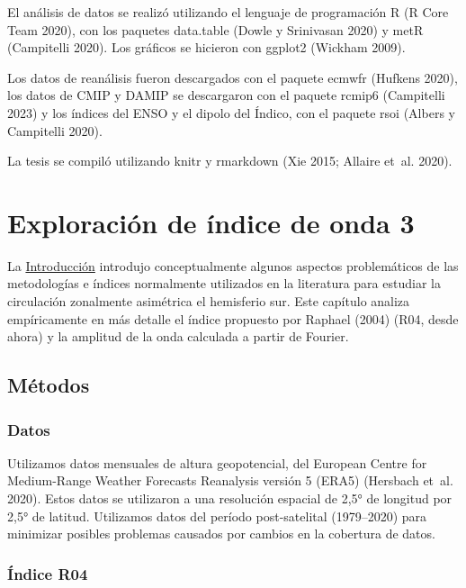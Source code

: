 \documentclass[12pt,oneside,a4paper]{reedthesis}
\begin{document}
El análisis de datos se realizó utilizando el lenguaje de programación R (R Core Team 2020), con los paquetes data.table (Dowle y Srinivasan 2020) y metR (Campitelli 2020).
Los gráficos se hicieron con ggplot2 (Wickham 2009).

Los datos de reanálisis fueron descargados con el paquete ecmwfr (Hufkens 2020), los datos de CMIP y DAMIP se descargaron con el paquete rcmip6 (Campitelli 2023) y los índices del ENSO y el dipolo del Índico, con el paquete rsoi (Albers y Campitelli 2020).

La tesis se compiló utilizando knitr y rmarkdown (Xie 2015; Allaire et~al. 2020).

\hypertarget{exploraciuxf3n-de-uxedndice-de-onda-3}{%
\chapter{Exploración de índice de onda 3}\label{exploraciuxf3n-de-uxedndice-de-onda-3}}

La \protect\hyperlink{intro}{Introducción} introdujo conceptualmente algunos aspectos problemáticos de las metodologías e índices normalmente utilizados en la literatura para estudiar la circulación zonalmente asimétrica el hemisferio sur.
Este capítulo analiza empíricamente en más detalle el índice propuesto por Raphael (2004) (R04, desde ahora) y la amplitud de la onda calculada a partir de Fourier.

\hypertarget{muxe9todos-1}{%
\section{Métodos}\label{muxe9todos-1}}

\hypertarget{datos-1}{%
\subsection{Datos}\label{datos-1}}

Utilizamos datos mensuales de altura geopotencial, del European Centre for Medium-Range Weather Forecasts Reanalysis versión 5 (ERA5) (Hersbach et~al. 2020). Estos datos se utilizaron a una resolución espacial de 2,5° de longitud por 2,5° de latitud.
Utilizamos datos del período post-satelital (1979--2020) para minimizar posibles problemas causados por cambios en la cobertura de datos.

\hypertarget{uxedndice-r04}{%
\subsection{Índice R04}\label{uxedndice-r04}}
\end{document}
